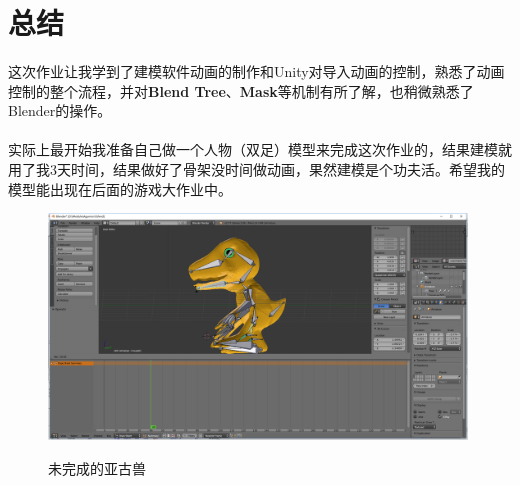 \documentclass{article}
\begin{document}
\section{总结}
\paragraph{}
这次作业让我学到了建模软件动画的制作和Unity对导入动画的控制，熟悉了动画控制的整个流程，并对\textbf{Blend Tree}、\textbf{Mask}等机制有所了解，也稍微熟悉了Blender的操作。
\paragraph{}
实际上最开始我准备自己做一个人物（双足）模型来完成这次作业的，结果建模就用了我3天时间，结果做好了骨架没时间做动画，果然建模是个功夫活。希望我的模型能出现在后面的游戏大作业中。
\begin{figure}[H]
  \centering
  \includegraphics[width=30em]{Agumon.png}\\
  \caption{未完成的亚古兽}\label{4-1}
\end{figure}
\end{document}
